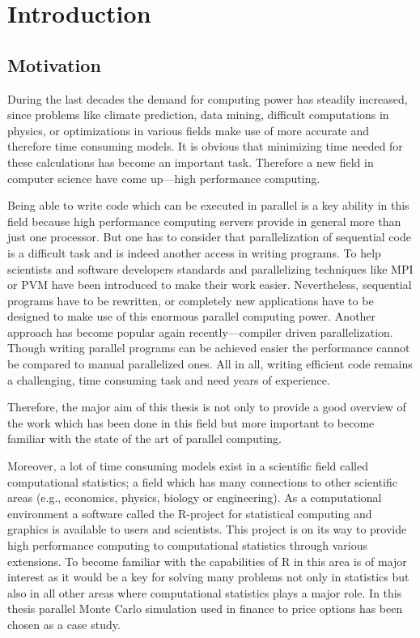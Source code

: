 \chapter{Introduction}
\section{Motivation}
During the last decades the demand for computing power has steadily
increased, since problems like climate prediction, data mining, difficult
computations in physics, or optimizations in various fields
make use of more accurate and therefore time consuming models. It is
obvious that minimizing time needed for these calculations has become
an important task. Therefore a new field in computer science have come
up---high performance computing.

Being able to write code which can be executed in parallel is a key
ability in this field because high performance computing servers
provide in general more than just one processor. But one has to
consider that
parallelization of sequential code is a difficult task and is indeed
another access in writing programs. To help scientists and software
developers standards and parallelizing techniques like MPI or PVM have
been introduced 
to make their work easier. Nevertheless, sequential programs have to
be rewritten, or completely new applications have to be designed to
make use of this enormous parallel computing power. Another approach
has become popular again recently---compiler driven
parallelization. Though writing parallel programs can be achieved
easier the performance cannot be compared to manual parallelized ones.
All in all,
writing efficient code remains a challenging, time consuming task and
need years of experience. 

Therefore, the major aim of this thesis is not only to 
provide a good overview of the work which has been done in this field
but more important to become familiar with the state of the art of
parallel computing.

Moreover, a lot of  time consuming models exist in a scientific field
called computational statistics; a field which has many connections to other
scientific areas (e.g., economics, physics, biology or
engineering). As a computational environment a software called the
R-project for statistical computing and graphics is available to
users and scientists. This project is on its way to provide 
high performance computing to computational statistics through various
extensions. To become familiar with the capabilities of R in
this area is of major interest as it would be a key for solving many
problems not only in statistics but also in all other areas where
computational statistics plays a major role. In this thesis parallel
Monte Carlo simulation used in finance to price options has been
chosen as a case study.

